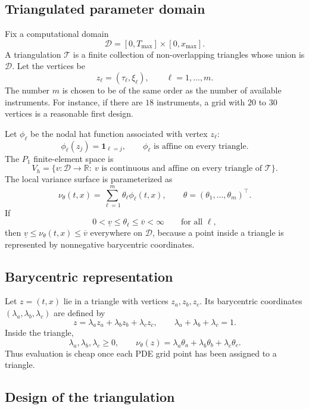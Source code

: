 \documentclass[11pt]{article}
\newcommand{\R}{\mathbb{R}}
\newcommand{\1}{\mathbf{1}}
\newcommand{\vloc}{\nu}
\newcommand{\Tmax}{T_{\max}}
\newcommand{\xmax}{x_{\max}}
\begin{document}
\subsection{Triangulated parameter domain}

Fix a computational domain
\[
  \mathcal D=[0,\Tmax]\times[0,\xmax].
\]
A triangulation $\mathcal T$ is a finite collection of non-overlapping triangles whose
union is $\mathcal D$. Let the vertices be
\[
  z_\ell=(\tau_\ell,\xi_\ell),\qquad \ell=1,\ldots,m.
\]
The number $m$ is chosen to be of the same order as the number of available instruments.
For instance, if there are $18$ instruments, a grid with $20$ to $30$ vertices is a
reasonable first design.

Let $\phi_\ell$ be the nodal hat function associated with vertex $z_\ell$:
\[
  \phi_\ell(z_j)=\1_{\ell=j},\qquad
  \phi_\ell\text{ is affine on every triangle.}
\]
The $P_1$ finite-element space is
\[
  V_h=\{v:\mathcal D\to\R:\ v \text{ is continuous and affine on every triangle of }
  \mathcal T\}.
\]
The local variance surface is parameterized as
\begin{equation}
  \vloc_\theta(t,x)=\sum_{\ell=1}^{m}\theta_\ell\phi_\ell(t,x),
  \qquad \theta=(\theta_1,\ldots,\theta_m)^\top.
  \label{eq:p1_lv}
\end{equation}
If
\[
  0<\underline v\le \theta_\ell\le \overline v<\infty
  \qquad \text{for all }\ell,
\]
then $\underline v\le \vloc_\theta(t,x)\le\overline v$ everywhere on $\mathcal D$,
because a point inside a triangle is represented by nonnegative barycentric coordinates.

\subsection{Barycentric representation}

Let $z=(t,x)$ lie in a triangle with vertices $z_a,z_b,z_c$. Its barycentric coordinates
$(\lambda_a,\lambda_b,\lambda_c)$ are defined by
\[
  z=\lambda_a z_a+\lambda_b z_b+\lambda_c z_c,\qquad
  \lambda_a+\lambda_b+\lambda_c=1.
\]
Inside the triangle,
\[
  \lambda_a,\lambda_b,\lambda_c\ge0,
  \qquad
  \vloc_\theta(z)
  =\lambda_a\theta_a+\lambda_b\theta_b+\lambda_c\theta_c.
\]
Thus evaluation is cheap once each PDE grid point has been assigned to a triangle.

\subsection{Design of the triangulation}
\end{document}
